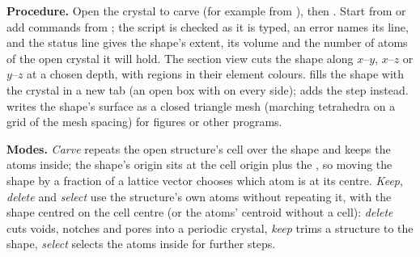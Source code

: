 \textbf{Procedure.} Open the crystal to carve (for example from ), then . Start from  or add commands from ; the script is checked as it is typed, an error names its line, and the status line gives the shape's extent, its volume and the number of atoms of the open crystal it will hold. The section view cuts the shape along $x$--$y$, $x$--$z$ or $y$--$z$ at a chosen depth, with regions in their element colours.  fills the shape with the crystal in a new tab (an open box with  on every side);  adds the  step instead.  writes the shape's surface as a closed triangle mesh (marching tetrahedra on a grid of the mesh spacing) for figures or other programs.

\textbf{Modes.} \emph{Carve} repeats the open structure's cell over the shape and keeps the atoms inside; the shape's origin sits at the cell origin plus the , so moving the shape by a fraction of a lattice vector chooses which atom is at its centre. \emph{Keep}, \emph{delete} and \emph{select} use the structure's own atoms without repeating it, with the shape centred on the cell centre (or the atoms' centroid without a cell): \emph{delete} cuts voids, notches and pores into a periodic crystal, \emph{keep} trims a structure to the shape, \emph{select} selects the atoms inside for further steps.


